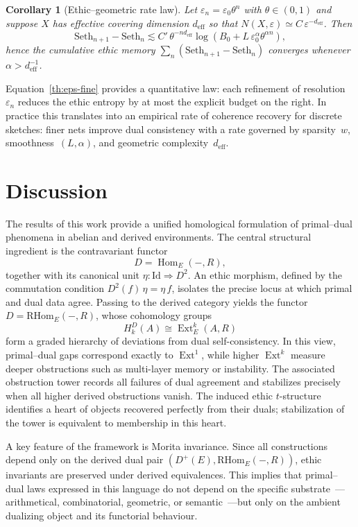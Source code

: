 \documentclass[12pt]{article}
\theoremstyle{plain}
\newtheorem{corollary}[theorem]{Corollary}
\theoremstyle{definition}
\theoremstyle{remark}
\numberwithin{equation}{section}
\begin{document}
\begin{corollary}[Ethic–geometric rate law]
Let $\varepsilon_n=\varepsilon_0\theta^n$ with $\theta\in(0,1)$
and suppose $X$ has effective covering dimension $d_{\mathrm{eff}}$
so that $N(X,\varepsilon)\simeq C\,\varepsilon^{-d_{\mathrm{eff}}}$.
Then
\[
\mathrm{Seth}_{n+1}-\mathrm{Seth}_n
 \lesssim
 C'\,\theta^{-n d_{\mathrm{eff}}}
 \log(B_0+L\,\varepsilon_0^\alpha\theta^{\alpha n}),
\]
hence the cumulative ethic memory
$\sum_n(\mathrm{Seth}_{n+1}-\mathrm{Seth}_n)$ converges whenever
$\alpha>d_{\mathrm{eff}}^{-1}$.
\end{corollary}

Equation~\eqref{th:eps-fine} provides a quantitative law:
each refinement of resolution $\varepsilon_n$
reduces the ethic entropy by at most the explicit budget on the right.
In practice this translates into an empirical rate of coherence recovery
for discrete sketches: finer nets improve dual consistency
with a rate governed by sparsity~$w$, smoothness~$(L,\alpha)$,
and geometric complexity~$d_{\mathrm{eff}}$.

\section*{Discussion}

The results of this work provide a unified homological formulation of primal--dual
phenomena in abelian and derived environments. The central structural ingredient is
the contravariant functor
\[
D=\operatorname{Hom}_E(-,R),
\]
together with its canonical unit $\eta:\mathrm{Id}\Rightarrow D^2$.
An ethic morphism, defined by the commutation condition
$D^2(f)\,\eta=\eta\,f$, isolates the precise locus at which primal and dual data
agree. Passing to the derived category yields the functor
$D=\mathrm{RHom}_E(-,R)$, whose cohomology groups
\[
H_k^D(A)\cong \operatorname{Ext}^k_E(A,R)
\]
form a graded hierarchy of deviations from dual self-consistency. In this view,
primal--dual gaps correspond exactly to $\operatorname{Ext}^1$, while higher
$\operatorname{Ext}^k$ measure deeper obstructions such as multi-layer memory or
instability. The associated obstruction tower records all failures of dual
agreement and stabilizes precisely when all higher derived obstructions vanish.
The induced ethic $t$-structure identifies a heart of objects recovered perfectly
from their duals; stabilization of the tower is equivalent to membership in this
heart.

A key feature of the framework is Morita invariance. Since all constructions depend
only on the derived dual pair $(D^+(E),\mathrm{RHom}_E(-,R))$, ethic invariants are
preserved under derived equivalences. This implies that primal--dual laws expressed
in this language do not depend on the specific substrate~---arithmetical,
combinatorial, geometric, or semantic~---but only on the ambient dualizing object
and its functorial behaviour.
\end{document}
